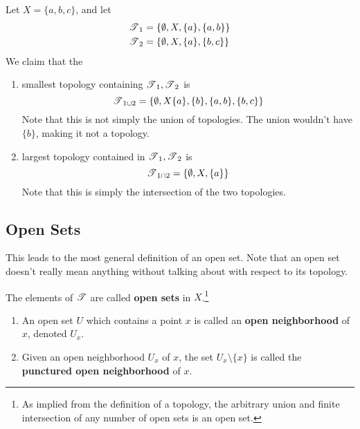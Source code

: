   \begin{example}
    Let $X = \{a, b, c\}$, and let 
    \begin{align}
      \T_1 & = \{\emptyset, X, \{a\}, \{a, b\}\} \\
      \T_2 & = \{\emptyset, X, \{a\}, \{b, c\}\}
    \end{align}
    We claim that the 
    \begin{enumerate}
      \item smallest topology containing $\T_1, \T_2$ is 
      \begin{equation}
        \T_{1 \cup 2} = \{\emptyset, X \{a\}, \{b\}, \{a, b\}, \{b, c\}\}
      \end{equation} 
      Note that this is not simply the union of topologies. The union wouldn't have $\{b\}$, making it not a topology. 

      \item largest topology contained in $\T_1, \T_2$ is 
      \begin{equation}
        \T_{1 \cap 2} = \{\emptyset, X, \{a\}\}
      \end{equation}
      Note that this is simply the intersection of the two topologies. 
    \end{enumerate}
  \end{example}

\subsection{Open Sets}

  This leads to the most general definition of an open set. Note that an open set doesn't really mean anything without talking about with respect to its topology. 

  \begin{definition}
    The elements of $\T$ are called \textbf{open sets} in $X$.\footnote{As implied from the definition of a topology, the arbitrary union and finite intersection of any number of open sets is an open set.} 
    \begin{enumerate}
      \item An open set $U$ which contains a point $x$ is called an \textbf{open neighborhood} of $x$, denoted $U_x$. 
      \item Given an open neighborhood $U_x$ of $x$, the set $U_x \setminus \{x\}$ is called the \textbf{punctured open neighborhood} of $x$. 
    \end{enumerate}
  \end{definition}

